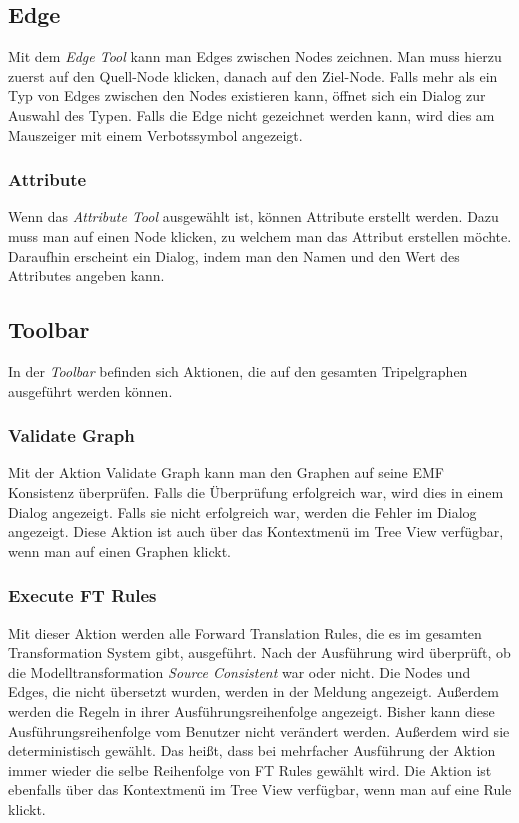 \subsection{Edge}
\label{subsubsec:Graph_View-Edge}
Mit dem \emph{Edge Tool} kann man Edges zwischen Nodes zeichnen. Man muss hierzu zuerst auf den Quell-Node klicken, danach auf den Ziel-Node. Falls mehr als ein Typ von Edges zwischen den Nodes existieren kann, öffnet sich ein Dialog zur Auswahl des Typen. Falls die Edge nicht gezeichnet werden kann, wird dies am Mauszeiger mit einem Verbotssymbol angezeigt.

\subsubsection{Attribute}
\label{subsubsec:Graph_View-Attribute}
Wenn das \emph{Attribute Tool} ausgewählt ist, können Attribute erstellt werden. Dazu muss man auf einen Node klicken, zu welchem man das Attribut erstellen möchte. Daraufhin erscheint ein Dialog, indem man den Namen und den Wert des Attributes angeben kann.

\subsection{Toolbar}
In der \emph{Toolbar} befinden sich Aktionen, die auf den gesamten Tripelgraphen ausgeführt werden können.

\subsubsection{Validate Graph}
Mit der Aktion Validate Graph kann man den Graphen auf seine EMF Konsistenz überprüfen. Falls die Überprüfung erfolgreich war, wird dies in einem Dialog angezeigt. Falls sie nicht erfolgreich war, werden die Fehler im Dialog angezeigt. Diese Aktion ist auch über das Kontextmenü im Tree View verfügbar, wenn man auf einen Graphen klickt.

\subsubsection{Execute FT Rules}
Mit dieser Aktion werden alle Forward Translation Rules, die es im gesamten Transformation System gibt, ausgeführt. Nach der Ausführung wird überprüft, ob die Modelltransformation \emph{Source Consistent} war oder nicht. Die Nodes und Edges, die nicht übersetzt wurden, werden in der Meldung angezeigt. Außerdem werden die Regeln in ihrer Ausführungsreihenfolge angezeigt. Bisher kann diese Ausführungsreihenfolge vom Benutzer nicht verändert werden. Außerdem wird sie deterministisch gewählt. Das heißt, dass bei mehrfacher Ausführung der Aktion immer wieder die selbe Reihenfolge von FT Rules gewählt wird. Die Aktion ist ebenfalls über das Kontextmenü im Tree View verfügbar, wenn man auf eine Rule klickt.


